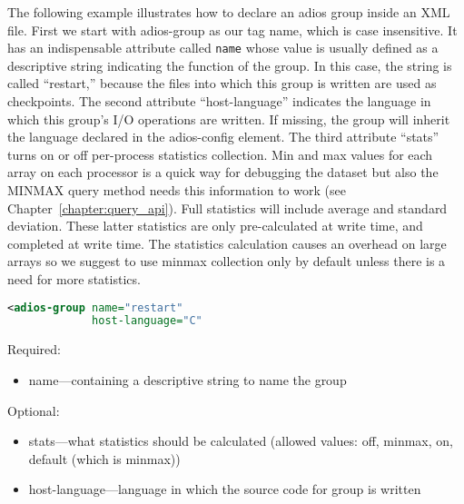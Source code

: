 The following example illustrates how to declare an adios group inside an XML file. 
First we start with adios-group as our tag name, which is case insensitive. It 
has an indispensable attribute called \verb+name+ whose value is usually defined 
as a descriptive string indicating the function of the group. In this case, the 
string is called ``restart,'' because the files into which this group is written 
are used as checkpoints. The second attribute ``host-language'' indicates the language 
in which this group's I/O operations are written. If missing, the group will inherit the language declared in 
the adios-config element. The third attribute ``stats'' turns on or off per-process statistics collection. 
Min and max values for each array on each processor is a quick way for debugging the dataset but also the MINMAX query method needs this information to work (see Chapter~\ref{chapter:query_api}). Full statistics will include average and standard deviation. These latter statistics are only pre-calculated at write time, and completed at write time. The statistics calculation causes an overhead on large arrays so we suggest to use minmax collection only by default unless there is a need for more statistics. 

\begin{lstlisting}[language=XML]
<adios-group name="restart"
             host-language="C"
\end{lstlisting}

Required:
\begin{itemize}
\item name---containing a descriptive string to name the group
\end{itemize}

Optional:
\begin{itemize}
\item stats---what statistics should be calculated (allowed values: off, minmax, on, default (which is minmax))
\item host-language---language in which the source code for group is written
\end{itemize}


